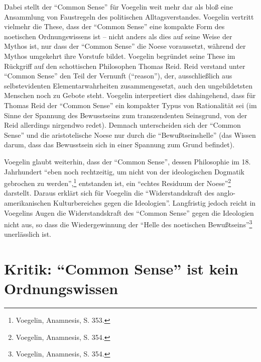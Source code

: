Dabei stellt der "`Common Sense"' für Voegelin weit mehr dar als bloß eine
Ansammlung von Faustregeln des politischen Alltagsverstandes. Voegelin
vertritt vielmehr die These, dass der "`Common Sense"' eine kompakte Form des
noetischen Ordnungswissens ist -- nicht anders als dies auf seine Weise der
Mythos ist, nur dass der "`Common Sense"' die Noese voraussetzt, während der
Mythos umgekehrt ihre Vorstufe bildet. Voegelin begründet seine These im
Rückgriff auf den schottischen Philosophen Thomas Reid. Reid verstand unter
"`Common Sense"' den Teil der Vernunft ("`reason"'), der, ausschließlich aus
selbstevidenten Elementarwahrheiten zusammengesetzt, auch den ungebildetsten
Menschen noch zu Gebote steht. Voegelin interpretiert dies dahingehend, dass
für Thomas Reid der "`Common Sense"' ein kompakter Typus von Rationalität sei
(im Sinne der Spannung des Bewusstseins zum transzendenten Seinsgrund, von der
Reid allerdings nirgendwo redet).  Demnach unterscheiden sich der "`Common
Sense"' und die aristotelische Noese nur durch die "`Bewußtseinshelle"' (das
Wissen darum, dass das Bewusstsein sich in einer Spannung zum Grund befindet).

Voegelin glaubt weiterhin, dass der "`Common Sense"', dessen Philosophie im
18. Jahrhundert "`eben noch rechtzeitig, um nicht von der ideologischen
Dogmatik gebrochen zu werden"',\footnote{Voegelin, Anamnesis, S. 353.}
entstanden ist, ein "`echtes Residuum der Noese"'\footnote{Voegelin,
  Anamnesis, S. 354.} darstellt. Daraus erklärt sich für Voegelin die
"`Widerstandskraft des anglo-amerikanischen Kulturbereiches gegen die
Ideologien"'. Langfristig jedoch reicht in Voegelins Augen die
Widerstandskraft des "`Common Sense"' gegen die Ideologien nicht aus, so dass
die Wiedergewinnung der "`Helle des noetischen
Bewußtseins"'\footnote{Voegelin, Anamnesis, S. 354.} unerlässlich ist.
  
\section{Kritik: "`Common Sense"' ist kein Ordnungswissen}

